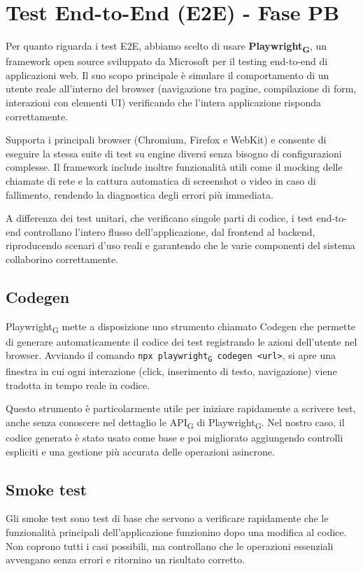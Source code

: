 \documentclass[11pt,a4paper]{article}
\newcommand{\gls}[1]{#1\textsubscript{G}}
\begin{document}
\newpage

\section{Test End-to-End (E2E) - Fase PB}
Per quanto riguarda i test E2E, abbiamo scelto di usare \textbf{\gls{Playwright}}, un framework open source sviluppato da Microsoft per il testing end-to-end di applicazioni web. Il suo scopo principale è simulare il comportamento di un utente reale all'interno del browser (navigazione tra pagine, compilazione di form, interazioni con elementi UI) verificando che l'intera applicazione risponda correttamente.

Supporta i principali browser (Chromium, Firefox e WebKit) e consente di eseguire la stessa suite di test su engine diversi senza bisogno di configurazioni complesse. Il framework include inoltre funzionalità utili come il mocking delle chiamate di rete e la cattura automatica di screenshot o video in caso di fallimento, rendendo la diagnostica degli errori più immediata.

A differenza dei test unitari, che verificano singole parti di codice, i test end-to-end controllano l’intero flusso dell’applicazione, dal frontend al backend, riproducendo scenari d'uso reali e garantendo che le varie componenti del sistema collaborino correttamente.

\subsection{Codegen}
\gls{Playwright} mette a disposizione uno strumento chiamato Codegen che permette di generare automaticamente il codice dei test registrando le azioni dell’utente nel browser. Avviando il comando \texttt{npx \gls{playwright} codegen <url>}, si apre una finestra in cui ogni interazione (click, inserimento di testo, navigazione) viene tradotta in tempo reale in codice.

Questo strumento è particolarmente utile per iniziare rapidamente a scrivere test, anche senza conoscere nel dettaglio le \gls{API} di \gls{Playwright}. Nel nostro caso, il codice generato è stato usato come base e poi migliorato aggiungendo controlli espliciti e una gestione più accurata delle operazioni asincrone.

\subsection{Smoke test}
Gli smoke test sono test di base che servono a verificare rapidamente che le funzionalità principali dell’applicazione funzionino dopo una modifica al codice. Non coprono tutti i casi possibili, ma controllano che le operazioni essenziali avvengano senza errori e ritornino un risultato corretto.
\end{document}
